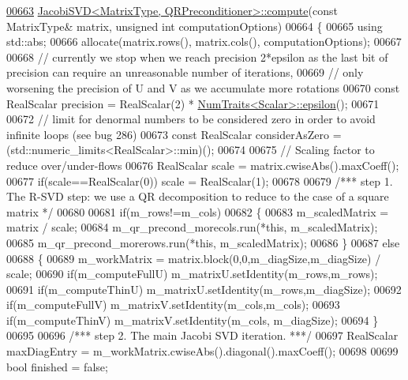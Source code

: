 \begin{DoxyCode}
\hyperlink{group___s_v_d___module_a5dab376cc86cf0d36674bcdad4af3f5a}{00663} \hyperlink{group___s_v_d___module_a5dab376cc86cf0d36674bcdad4af3f5a}{JacobiSVD<MatrixType, QRPreconditioner>::compute}(\textcolor{keyword}{const} 
      MatrixType& matrix, \textcolor{keywordtype}{unsigned} \textcolor{keywordtype}{int} computationOptions)
00664 \{
00665   \textcolor{keyword}{using} std::abs;
00666   allocate(matrix.rows(), matrix.cols(), computationOptions);
00667 
00668   \textcolor{comment}{// currently we stop when we reach precision 2*epsilon as the last bit of precision can require an
       unreasonable number of iterations,}
00669   \textcolor{comment}{// only worsening the precision of U and V as we accumulate more rotations}
00670   \textcolor{keyword}{const} RealScalar precision = RealScalar(2) * \hyperlink{group___core___module_struct_eigen_1_1_num_traits}{NumTraits<Scalar>::epsilon}();
00671 
00672   \textcolor{comment}{// limit for denormal numbers to be considered zero in order to avoid infinite loops (see bug 286)}
00673   \textcolor{keyword}{const} RealScalar considerAsZero = (std::numeric\_limits<RealScalar>::min)();
00674 
00675   \textcolor{comment}{// Scaling factor to reduce over/under-flows}
00676   RealScalar scale = matrix.cwiseAbs().maxCoeff();
00677   \textcolor{keywordflow}{if}(scale==RealScalar(0)) scale = RealScalar(1);
00678   
00679   \textcolor{comment}{/*** step 1. The R-SVD step: we use a QR decomposition to reduce to the case of a square matrix */}
00680 
00681   \textcolor{keywordflow}{if}(m\_rows!=m\_cols)
00682   \{
00683     m\_scaledMatrix = matrix / scale;
00684     m\_qr\_precond\_morecols.run(*\textcolor{keyword}{this}, m\_scaledMatrix);
00685     m\_qr\_precond\_morerows.run(*\textcolor{keyword}{this}, m\_scaledMatrix);
00686   \}
00687   \textcolor{keywordflow}{else}
00688   \{
00689     m\_workMatrix = matrix.block(0,0,m\_diagSize,m\_diagSize) / scale;
00690     \textcolor{keywordflow}{if}(m\_computeFullU) m\_matrixU.setIdentity(m\_rows,m\_rows);
00691     \textcolor{keywordflow}{if}(m\_computeThinU) m\_matrixU.setIdentity(m\_rows,m\_diagSize);
00692     \textcolor{keywordflow}{if}(m\_computeFullV) m\_matrixV.setIdentity(m\_cols,m\_cols);
00693     \textcolor{keywordflow}{if}(m\_computeThinV) m\_matrixV.setIdentity(m\_cols, m\_diagSize);
00694   \}
00695 
00696   \textcolor{comment}{/*** step 2. The main Jacobi SVD iteration. ***/}
00697   RealScalar maxDiagEntry = m\_workMatrix.cwiseAbs().diagonal().maxCoeff();
00698 
00699   \textcolor{keywordtype}{bool} finished = \textcolor{keyword}{false};

\end{DoxyCode}
